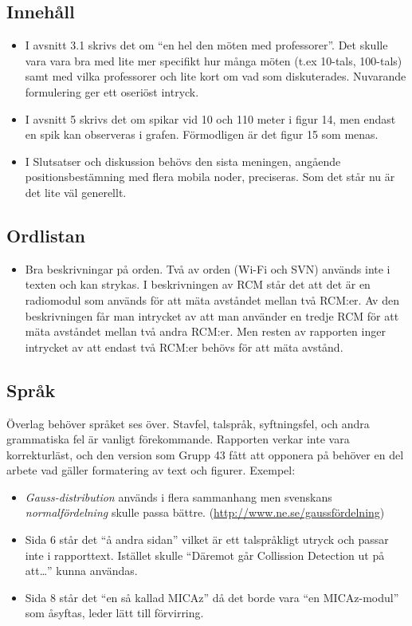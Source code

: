 \documentclass[a4paper,11pt]{article}
\begin{document}
\subsection{Innehåll}

\begin{itemize}
   \item I avsnitt 3.1 skrivs det om “en hel den möten med professorer”. Det skulle vara vara bra med lite mer specifikt hur många möten (t.ex 10-tals, 100-tals) samt med vilka professorer och lite kort om vad som diskuterades. Nuvarande formulering ger ett oseriöst intryck.
   \item I avsnitt 5 skrivs det om spikar vid 10 och 110 meter i figur 14, men endast en spik kan observeras i grafen. Förmodligen är det figur 15 som menas.
   \item I Slutsatser och diskussion behövs den sista meningen, angående positionsbestämning med flera mobila noder, preciseras. Som det står nu är det lite väl generellt. 
\end{itemize}

\subsection{Ordlistan}

\begin{itemize}
   \item Bra beskrivningar på orden. Två av orden (Wi-Fi och SVN) används inte i texten och kan strykas. I beskrivningen av RCM står det att det är en radiomodul som används för att mäta avståndet mellan två RCM:er. Av den beskrivningen får man intrycket av att man använder en tredje RCM för att mäta avståndet mellan två andra RCM:er. Men resten av rapporten inger intrycket av att endast två RCM:er behövs för att mäta avstånd.
\end{itemize}

\subsection{Språk}

Överlag behöver språket ses över. Stavfel, talspråk, syftningsfel, och andra grammatiska fel är vanligt förekommande. Rapporten verkar inte vara korrekturläst, och den version som Grupp 43 fått att opponera på behöver en del arbete vad gäller formatering av text och figurer. Exempel:

\begin{itemize}
  \item \emph{Gauss-distribution} används i flera sammanhang men svenskans \emph{normalfördelning} skulle passa bättre. (\url{http://www.ne.se/gaussfördelning})
   \item Sida 6 står det “å andra sidan” vilket är ett talspråkligt utryck och passar inte i rapporttext. Istället skulle “Däremot går Collission Detection ut på att…” kunna användas.
   \item Sida 8 står det “en så kallad MICAz” då det borde vara “en MICAz-modul” som åsyftas, leder lätt till förvirring.
\end{itemize}
\end{document}
